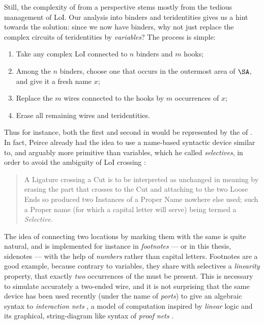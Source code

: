 \begin{scope}
\begin{scope}
Still, the complexity of  from a  perspective stems mostly from the
tedious management of LoI. Our analysis into binders and teridentities gives us
a hint towards the solution: since we now have binders, why not just replace
the complex circuits of teridentities by \emph{variables}? The process is
simple:
\begin{enumerate}
  \item Take any complex LoI connected to $n$ binders and $m$ hooks;
  \item Among the $n$ binders, choose one that occurs in the outermost area of
  $\SA$, and give it a fresh name $x$;
  \item Replace the $m$ wires connected to the hooks by $m$ occurrences of $x$;
  \item Erase all remaining wires and teridentities.
\end{enumerate}
Thus for instance, both the first and second  in
 would be represented by the  of
. In fact, Peirce already had the idea to use a
name-based syntactic device similar to, and arguably more primitive than
variables, which he called \emph{selectives}, in order to avoid the ambiguity of
LoI crossing  \cite[p.~531]{peirce_prolegomena_1906}:
\begin{quote}
A Ligature crossing a Cut is to be interpreted as unchanged in meaning by
erasing the part that crosses to the Cut and attaching to the two Loose Ends so
produced two Instances of a Proper Name nowhere else used; such a Proper name
(for which a capital letter will serve) being termed a \emph{Selective}.
\end{quote}
The idea of connecting two locations by marking them with the same  is
quite natural, and is implemented for instance in \emph{footnotes} --- or in
this thesis, sidenotes --- with the help of \emph{numbers} rather than capital
letters. Footnotes are a good example, because contrary to variables, they share
with selectives a \emph{linearity} property, that exactly \emph{two} occurrences
of the  must be present. This is necessary to simulate accurately a
two-ended wire, and it is not surprising that the same device has been used
recently (under the name of \emph{ports}) to give an algebraic syntax to
\emph{interaction nets} , a model of
computation inspired by \emph{linear} logic and its graphical, string-diagram
like syntax of \emph{proof nets} \cite{girard-linear-1987}.


\end{scope}
\end{scope}
